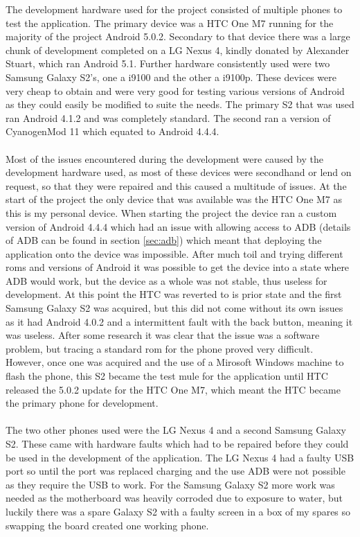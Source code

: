 The development hardware used for the project consisted of multiple phones to test the application. The primary device was a HTC One M7 running for the majority of the project Android 5.0.2. Secondary to that device there was a large chunk of development completed on a LG Nexus 4, kindly donated by Alexander Stuart, which ran Android 5.1. Further hardware consistently used were two Samsung Galaxy S2's, one a i9100 and the other a i9100p. These devices were very cheap to obtain and were very good for testing various versions of Android as they could easily be modified to suite the needs. The primary S2 that was used ran Android 4.1.2 and was completely standard. The second ran a version of CyanogenMod 11 which equated to Android 4.4.4.\\
\\
Most of the issues encountered during the development were caused by the development hardware used, as most of these devices were secondhand or lend on request, so that they were repaired and this caused a multitude of issues. At the start of the project the only device that was available was the HTC One M7 as this is my personal device. When starting the project the device ran a custom version of Android 4.4.4 which had an issue with allowing access to ADB (details of ADB can be found in section \ref{sec:adb}) which meant that deploying the application onto the device was impossible. After much toil and trying different roms and versions of Android it was possible to get the device into a state where ADB would work, but the device as a whole was not stable, thus useless for development. At this point the HTC was reverted to is prior state and the first Samsung Galaxy S2 was acquired, but this did not come without its own issues as it had Android 4.0.2 and a intermittent fault with the back button, meaning it was useless. After some research it was clear that the issue was a software problem, but tracing a standard rom for the phone proved very difficult. However, once one was acquired and the use of a Mirosoft Windows machine to flash the phone, this S2 became the test mule for the application until HTC released the 5.0.2 update for the HTC One M7, which meant the HTC became the primary phone for development.\\
\\
The two other phones used were the LG Nexus 4 and a second Samsung Galaxy S2. These came with hardware faults which had to be repaired before they could be used in the development of the application. The LG Nexus 4 had a faulty USB port so until the port was replaced charging and the use ADB were not possible as they require the USB to work. For the Samsung Galaxy S2 more work was needed as the motherboard was heavily corroded due to exposure to water, but luckily there was a spare Galaxy S2 with a faulty screen in a box of my spares so swapping the board created one working phone.\\
